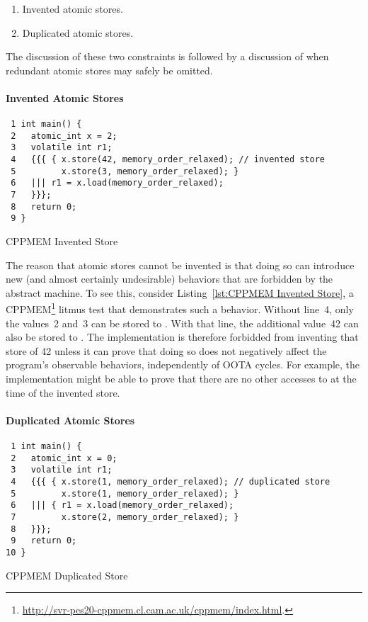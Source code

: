 \documentclass[10]{article}
\begin{document}
\begin{enumerate}
\item	Invented atomic stores.
\item	Duplicated atomic stores.
\end{enumerate}

The discussion of these two constraints is followed by a discussion of
when redundant atomic stores may safely be omitted.

\paragraph{Invented Atomic Stores}

\begin{listing}[tbp]
\begin{verbatim}
 1 int main() {
 2   atomic_int x = 2;
 3   volatile int r1;
 4   {{{ { x.store(42, memory_order_relaxed); // invented store
 5         x.store(3, memory_order_relaxed); }
 6   ||| r1 = x.load(memory_order_relaxed);
 7   }}};
 8   return 0;
 9 }
\end{verbatim}
\caption{CPPMEM Invented Store}
\label{lst:CPPMEM Invented Store}
\end{listing}

The reason that atomic stores cannot be invented is that doing so can
introduce new (and almost certainly undesirable) behaviors that are
forbidden by the abstract machine.
To see this, consider Listing~\ref{lst:CPPMEM Invented Store},
a CPPMEM\footnote{
	\url{http://svr-pes20-cppmem.cl.cam.ac.uk/cppmem/index.html}.}
litmus test that demonstrates such a behavior.
Without line~4, only the values~2 and~3 can be stored to .
With that line, the additional value~42 can also be stored to .
The implementation is therefore forbidded from inventing that store of 42
unless it can prove that doing so does not negatively affect the
program's observable behaviors, independently of OOTA cycles.
For example, the implementation might be able to prove that there
are no other accesses to  at the time of the invented store.

\paragraph{Duplicated Atomic Stores}

\begin{listing}[tbp]
\begin{verbatim}
 1 int main() {
 2   atomic_int x = 0;
 3   volatile int r1;
 4   {{{ { x.store(1, memory_order_relaxed); // duplicated store
 5         x.store(1, memory_order_relaxed); }
 6   ||| { r1 = x.load(memory_order_relaxed);
 7         x.store(2, memory_order_relaxed); }
 8   }}};
 9   return 0;
10 }
\end{verbatim}
\caption{CPPMEM Duplicated Store}
\label{lst:CPPMEM Duplicated Store}
\end{listing}
\end{document}
